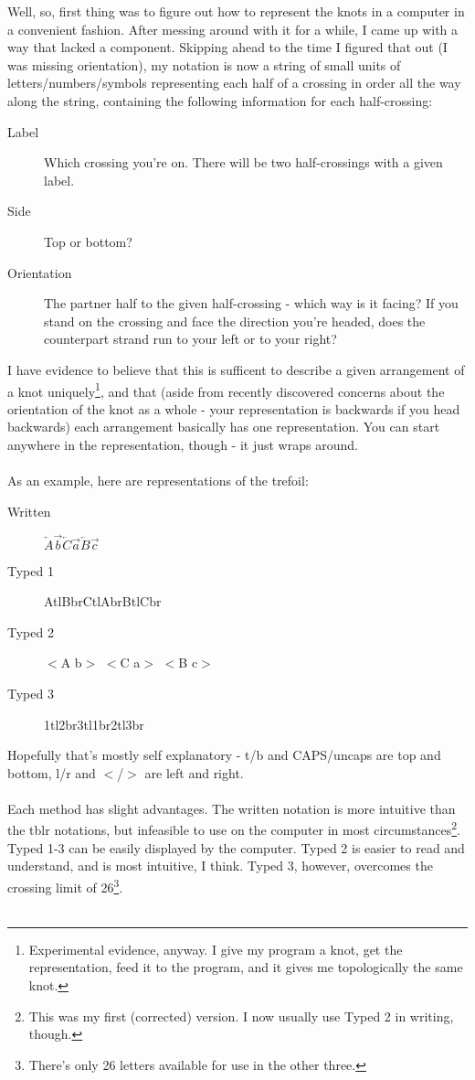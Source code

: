 \documentclass[twoside]{report}
\begin{document}
Well, so, first thing was to figure out how to represent the knots in a computer in a convenient fashion.  After messing around with it for a while, I came up with a way that lacked a component.  Skipping ahead to the time I figured that out (I was missing orientation), my notation is now a string of small units of letters/numbers/symbols representing each half of a crossing in order all the way along the string, containing the following information for each half-crossing:
\begin{description}
\item[Label] Which crossing you're on.  There will be two half-crossings with a given label.
\item[Side] Top or bottom?
\item[Orientation] The partner half to the given half-crossing - which way is it facing?  If you stand on the crossing and face the direction you're headed, does the counterpart strand run to your left or to your right?
\end{description}
I have evidence to believe that this is sufficent to describe a given arrangement of a knot uniquely\footnote{Experimental evidence, anyway.  I give my program a knot, get the representation, feed it to the program, and it gives me topologically the same knot.}, and that (aside from recently discovered concerns about the orientation of the knot as a whole - your representation is backwards if you head backwards) each arrangement basically has one representation.  You can start anywhere in the representation, though - it just wraps around.\\\\
As an example, here are representations of the trefoil:
\begin{description}
\item[Written] $\overleftarrow{A}\overrightarrow{b}\overleftarrow{C}\overrightarrow{a}\overleftarrow{B}\overrightarrow{c}$
\item[Typed 1] AtlBbrCtlAbrBtlCbr
\item[Typed 2] $<$A b$>$ $<$C a$>$ $<$B c$>$
\item[Typed 3] 1tl2br3tl1br2tl3br
\end{description}
Hopefully that's mostly self explanatory - t/b and CAPS/uncaps are top and bottom, l/r and $<$/$>$ are left and right.\\\\
Each method has slight advantages.  The written notation is more intuitive than the tblr notations, but infeasible to use on the computer in most circumstances\footnote{This was my first (corrected) version.  I now usually use Typed 2 in writing, though.}.  Typed 1-3 can be easily displayed by the computer.  Typed 2 is easier to read and understand, and is most intuitive, I think.  Typed 3, however, overcomes the crossing limit of 26\footnote{There's only 26 letters available for use in the other three.}.\\\\
\end{document}
